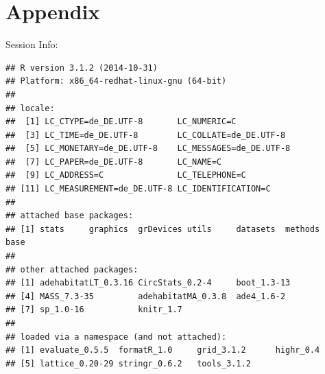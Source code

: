 \documentclass[11pt, a4paper]{article}\usepackage[]{graphicx}\usepackage[]{color}
\makeatletter
\newenvironment{kframe}{%
 \def\at@end@of@kframe{}%
 \ifinner\ifhmode%
  \def\at@end@of@kframe{\end{minipage}}%
  \begin{minipage}{\columnwidth}%
 \fi\fi%
 \def\FrameCommand##1{\hskip\@totalleftmargin \hskip-\fboxsep
 \colorbox{shadecolor}{##1}\hskip-\fboxsep
     \hskip-\linewidth \hskip-\@totalleftmargin \hskip\columnwidth}%
 \MakeFramed {\advance\hsize-\width
   \@totalleftmargin\z@ \linewidth\hsize
   \@setminipage}}%
 {\par\unskip\endMakeFramed%
 \at@end@of@kframe}
\newenvironment{knitrout}{}{} %
\makeatother
\begin{document}
\section{Appendix}

Session Info:
\begin{knitrout}
\color{fgcolor}\begin{kframe}
\begin{verbatim}
## R version 3.1.2 (2014-10-31)
## Platform: x86_64-redhat-linux-gnu (64-bit)
## 
## locale:
##  [1] LC_CTYPE=de_DE.UTF-8       LC_NUMERIC=C              
##  [3] LC_TIME=de_DE.UTF-8        LC_COLLATE=de_DE.UTF-8    
##  [5] LC_MONETARY=de_DE.UTF-8    LC_MESSAGES=de_DE.UTF-8   
##  [7] LC_PAPER=de_DE.UTF-8       LC_NAME=C                 
##  [9] LC_ADDRESS=C               LC_TELEPHONE=C            
## [11] LC_MEASUREMENT=de_DE.UTF-8 LC_IDENTIFICATION=C       
## 
## attached base packages:
## [1] stats     graphics  grDevices utils     datasets  methods   base     
## 
## other attached packages:
## [1] adehabitatLT_0.3.16 CircStats_0.2-4     boot_1.3-13        
## [4] MASS_7.3-35         adehabitatMA_0.3.8  ade4_1.6-2         
## [7] sp_1.0-16           knitr_1.7          
## 
## loaded via a namespace (and not attached):
## [1] evaluate_0.5.5  formatR_1.0     grid_3.1.2      highr_0.4      
## [5] lattice_0.20-29 stringr_0.6.2   tools_3.1.2
\end{verbatim}
\end{kframe}
\end{knitrout}

{}

\end{document}
